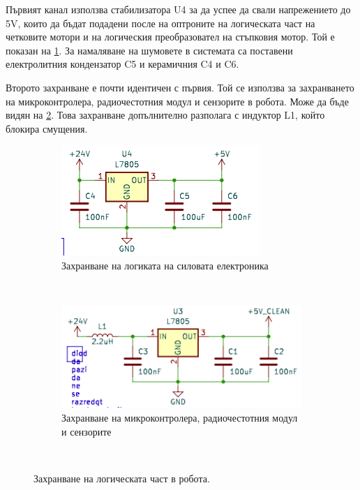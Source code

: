 Първият канал използва стабилизатора U4 за да успее да свали напрежението до 5V, които да бъдат подадени после на оптроните на логическата част на четковите мотори и на логическия преобразовател на стъпковия мотор. Той е показан на \cref{fig:power-5V}. За намаляване на шумовете в системата са поставени електролитния кондензатор C5 и керамичния C4 и C6. 

Второто захранване е почти идентичен с първия. Той се използва за захранването на микроконтролера, радиочестотния модул и сензорите в робота. Може да бъде видян на \cref{fig:power-5V-clean}. Това захранване допълнително разполага с индуктор L1, който блокира смущения.

\begin{figure}[H] 
    \centering
    \begin{subfigure}[h]{0.6\textwidth}
        \includegraphics[width=\textwidth]{images/power-5V.png}
        \caption{Захранване на логиката на силовата електроника}
        \label{fig:power-5V}
    \end{subfigure}
    \\ %
    \begin{subfigure}[h]{0.75\textwidth}
        \includegraphics[width=\textwidth]{images/power-5V-clean.png}
        \caption{Захранване на микроконтролера, радиочестотния модул и сензорите}
        \label{fig:power-5V-clean}
    \end{subfigure}
    ~ %
    \caption{Захранване на логическата част в робота.}
    \label{fig:power-low}
\end{figure}

